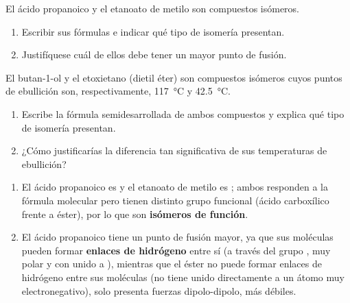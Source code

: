 \begin{exerciseEVAU}
    El ácido propanoico y el etanoato de metilo son compuestos isómeros.

    \begin{enumerate}[label=\letraminuscula]
        \item Escribir sus fórmulas e indicar qué tipo de isomería presentan.
        \item Justifíquese cuál de ellos debe tener un mayor punto de fusión.
    \end{enumerate}

    El butan-1-ol y el etoxietano (dietil éter) son compuestos isómeros cuyos puntos de ebullición son, respectivamente, \qty{117}{\degreeCelsius} y \qty{42.5}{\degreeCelsius}.

    \begin{enumerate}[label=\letraminuscula]
        \item Escribe la fórmula semidesarrollada de ambos compuestos y explica qué tipo de isomería presentan.
        \item ¿Cómo justificarías la diferencia tan significativa de sus temperaturas de ebullición?
    \end{enumerate}

    \begin{solu}


        \begin{enumerate}[label=\letraminuscula]
            \item El ácido propanoico es  y el etanoato de metilo es ; ambos responden a la fórmula molecular  pero tienen distinto grupo funcional (ácido carboxílico frente a éster), por lo que son \textbf{isómeros de función}.

            \item El ácido propanoico tiene un punto de fusión mayor, ya que sus moléculas pueden formar \textbf{enlaces de hidrógeno} entre sí (a través del grupo , muy polar y con  unido a ), mientras que el éster no puede formar enlaces de hidrógeno entre sus moléculas (no tiene  unido directamente a un átomo muy electronegativo), solo presenta fuerzas dipolo-dipolo, más débiles.
        \end{enumerate}


\end{solu}
\end{exerciseEVAU}
